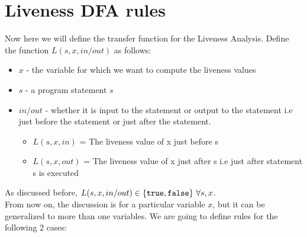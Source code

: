 \setlength{\parindent}{0pt}

\clearpage
\section{Liveness DFA rules}
Now here we will define the transfer function for the Liveness Analysis. Define the function $L(s,x,in/out)$ as follows:

\begin{itemize}
    \item $x$ - the variable for which we want to compute the liveness values
    \item $s$ - a program statement $s$
    \item $in/out$ - whether it is input to the statement or output to the statement i.e just before the statement or just after the statement.
    \begin{itemize}
        \item $L(s, x, in)$ = The liveness value of x just before s
        \item $L(s, x, out)$ = The liveness value of x just after s i.e just after statement s is executed
    \end{itemize}
\end{itemize}

As discussed before, $L(s,x,in/out) \in \{{\tt true}, {\tt false}\}~\forall s,x$.\\

From now on, the discussion is for a particular variable $x$, but it can be generalized to more than one variables. We are going to define rules for the following 2 cases:


